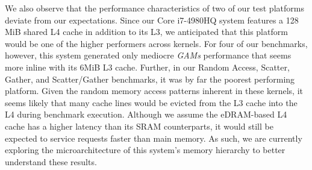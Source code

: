 We also observe that the performance characteristics of two of our test platforms deviate from our expectations.
Since our Core i7-4980HQ system features a 128 MiB shared L4 cache in addition to its L3, we anticipated that this platform would be one of the higher performers across kernels.
For four of our benchmarks, however, this system generated only mediocre \textit{GAMs} performance that seems more inline with its 6MiB L3 cache.
Further, in our Random Access, Scatter, Gather, and Scatter/Gather benchmarks, it was by far the poorest performing platform.
Given the random memory access patterns inherent in these kernels, it seems likely that many cache lines would be evicted from the L3 cache into the L4 during benchmark execution.
Although we assume the eDRAM-based L4 cache has a higher latency than its SRAM counterparts, it would still be expected to service requests faster than main memory.
As such, we are currently exploring the microarchitecture of this system's memory hierarchy to better understand these results.

